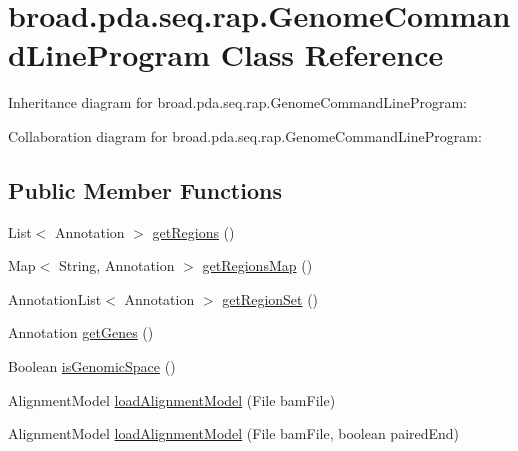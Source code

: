 \hypertarget{classbroad_1_1pda_1_1seq_1_1rap_1_1_genome_command_line_program}{\section{broad.\+pda.\+seq.\+rap.\+Genome\+Command\+Line\+Program Class Reference}
\label{classbroad_1_1pda_1_1seq_1_1rap_1_1_genome_command_line_program}
}


Inheritance diagram for broad.\+pda.\+seq.\+rap.\+Genome\+Command\+Line\+Program\+:


Collaboration diagram for broad.\+pda.\+seq.\+rap.\+Genome\+Command\+Line\+Program\+:
\subsection*{Public Member Functions}
\begin{DoxyCompactItemize}
\item 
List$<$ Annotation $>$ \hyperlink{classbroad_1_1pda_1_1seq_1_1rap_1_1_genome_command_line_program_af3dfa4b958b37f13cfccbe10e0ff7310}{get\+Regions} ()
\item 
Map$<$ String, Annotation $>$ \hyperlink{classbroad_1_1pda_1_1seq_1_1rap_1_1_genome_command_line_program_a2a2ff42e2b1724397090595d17a073d2}{get\+Regions\+Map} ()
\item 
Annotation\+List$<$ Annotation $>$ \hyperlink{classbroad_1_1pda_1_1seq_1_1rap_1_1_genome_command_line_program_a5114bc9a602f32c1c0e918e90b1f6f00}{get\+Region\+Set} ()
\item 
Annotation \hyperlink{classbroad_1_1pda_1_1seq_1_1rap_1_1_genome_command_line_program_ab1d7c1f083bc030ded1d014283d73201}{get\+Genes} ()
\item 
Boolean \hyperlink{classbroad_1_1pda_1_1seq_1_1rap_1_1_genome_command_line_program_a219dff1983f3e6c2b4c002c740074f9c}{is\+Genomic\+Space} ()
\item 
Alignment\+Model \hyperlink{classbroad_1_1pda_1_1seq_1_1rap_1_1_genome_command_line_program_ae60acc8e544e4f0edd1f4e8b46161c75}{load\+Alignment\+Model} (File bam\+File)
\item 
Alignment\+Model \hyperlink{classbroad_1_1pda_1_1seq_1_1rap_1_1_genome_command_line_program_a9c482c1e6dd0beaa23c15d08384815df}{load\+Alignment\+Model} (File bam\+File, boolean paired\+End)
\end{DoxyCompactItemize}

